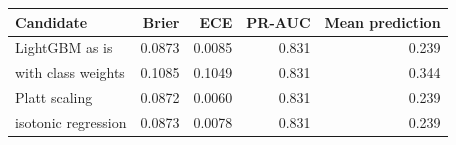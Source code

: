 \begin{tabular}{lrrrr}
\toprule
Candidate & Brier & ECE & PR-AUC & Mean prediction \\
\midrule
LightGBM as is & 0.0873 & 0.0085 & 0.831 & 0.239 \\
with class weights & 0.1085 & 0.1049 & 0.831 & 0.344 \\
Platt scaling & 0.0872 & 0.0060 & 0.831 & 0.239 \\
isotonic regression & 0.0873 & 0.0078 & 0.831 & 0.239 \\
\bottomrule
\end{tabular}
